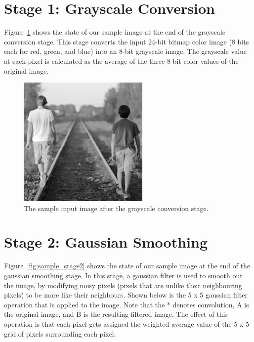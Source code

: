 \documentclass[epsfig,10pt,fullpage]{article}
\begin{document}
\pagebreak

\noindent
\section*{Stage 1: Grayscale Conversion}

Figure~\ref{fig:sample_stage1} shows the state of our sample image at the end of the grayscale 
conversion stage. This stage converts the input 24-bit bitmap color image (8 bits each for red, 
green, and blue) into an 8-bit grayscale image. The grayscale value at each pixel is calculated 
as the average of the three 8-bit color values of the original image.

\begin{figure}[H]
   \begin{center}
       \includegraphics[scale = 0.85]{figures/fig_stage1_grayscale.png}
   \end{center}
   \caption{The sample input image after the grayscale conversion stage.}
	\label{fig:sample_stage1}
\end{figure}

\noindent
\section*{Stage 2: Gaussian Smoothing}

Figure~\ref{fig:sample_stage2} shows the state of our sample image at the end of the gaussian 
smoothing stage. In this stage, a gaussian filter is used to smooth out the image, by 
modifying noisy pixels (pixels that are unlike their neighbouring pixels) to be more like 
their neighbours. Shown below is the 5 x 5 gaussian filter operation that is applied to the 
image. Note that the * denotes convolution, A is the original image, and B is the resulting 
filtered image. The effect of this operation is that each pixel gets assigned the weighted 
average value of the 5 x 5 grid of pixels surrounding each pixel.
\end{document}
